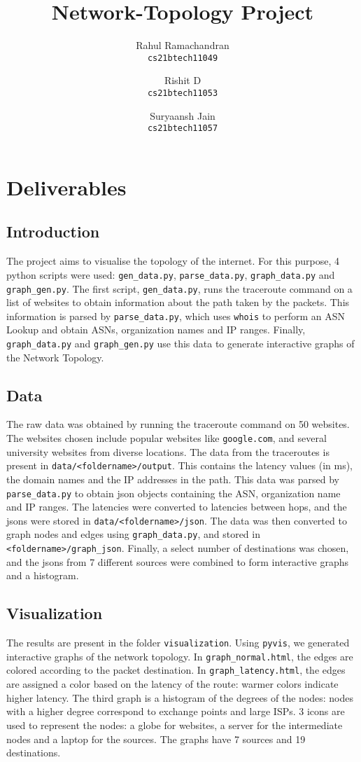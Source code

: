 \documentclass[a4paper, 11pt]{article}
\title{Network-Topology Project}
\author{
  Rahul Ramachandran\\
  \texttt{cs21btech11049}
  \and
  Rishit D\\
  \texttt{cs21btech11053}
  \and
  Suryaansh Jain\\
  \texttt{cs21btech11057}
}
\begin{document}
\maketitle
\tableofcontents

\section{Deliverables}

\subsection{Introduction}
The project aims to visualise the topology of the internet. For this purpose, 4 python scripts were used: \texttt{gen\_data.py}, \texttt{parse\_data.py}, \texttt{graph\_data.py} and \texttt{graph\_gen.py}. 
The first script, \texttt{gen\_data.py}, runs the traceroute command on a list of websites to obtain information about the path taken by the packets. This information is parsed by \texttt{parse\_data.py}, which 
uses \texttt{whois} to perform an ASN Lookup and obtain ASNs, organization names and IP ranges. Finally, \texttt{graph\_data.py} and \texttt{graph\_gen.py} use this data to generate interactive graphs of the Network
Topology.

\subsection{Data}
The raw data was obtained by running the traceroute command on 50 websites. The websites chosen include popular websites like \texttt{google.com}, and several university websites from diverse locations. The 
data from the traceroutes is present in \texttt{data/<foldername>/output}. This contains the latency values (in ms), the domain names and the IP addresses in the path. This data was parsed by \texttt{parse\_data.py} to obtain
json objects containing the ASN, organization name and IP ranges. The latencies were converted to latencies between hops, and the jsons were stored in \texttt{data/<foldername>/json}. The data was then converted to graph nodes and edges using 
\texttt{graph\_data.py}, and stored in \texttt{<foldername>/graph\_json}. Finally, a select number of destinations was chosen, and the jsons from 7 different sources were combined to form interactive graphs and a 
histogram.


\subsection{Visualization}
The results are present in the folder \texttt{visualization}. Using \texttt{pyvis}, we generated interactive graphs of the network topology. In \texttt{graph\_normal.html}, the edges are colored according to the
packet destination. In \texttt{graph\_latency.html}, the edges are assigned a color based on the latency of the route: warmer colors indicate higher latency. The third graph is a histogram of the degrees of the nodes: nodes with 
a higher degree correspond to exchange points and large ISPs. 3 icons are used to represent the nodes: a globe for websites, a server for the intermediate nodes and a laptop for the sources. The graphs have 7 sources 
and 19 destinations. 
\end{document}
